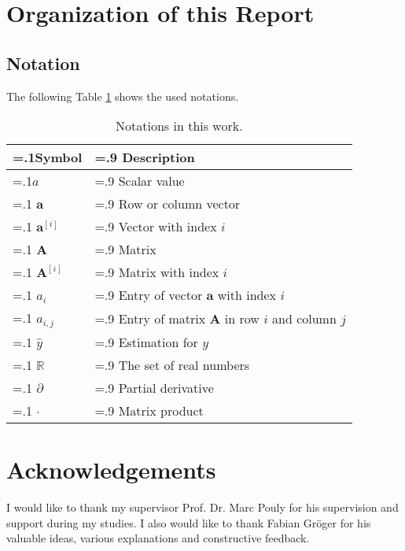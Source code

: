 \section{Organization of this Report}
\subsection{Notation}
The following Table \ref{tab:notation} shows the used notations.

\begin{table}[H]
\centering
\caption{Notations in this work.\label{tab:notation}}
\begin{tabularx}{\textwidth}{|
 >{\hsize=.1\hsize}X |
 >{\hsize=.9\hsize}X |
}
\hline
\textbf{Symbol} & \textbf{Description} \\ \hline
$a$ & Scalar value \\ \hline 
$\mathbf{a}$ & Row or column vector \\ \hline
$\mathbf{a}^{[i]}$ & Vector with index $i$  \\ \hline
$\mathbf{A}$ & Matrix \\ \hline 
$\mathbf{A}^{[i]}$ & Matrix with index $i$ \\ \hline 
$a_i$ & Entry of vector $\mathbf{a}$ with index $i$ \\ \hline 
$a_{i,j}$ & Entry of matrix $\mathbf{A}$ in row $i$ and column $j$ \\ \hline
$\hat{y}$ & Estimation for $y$ \\ \hline 
$\mathbb{R}$ & The set of real numbers \\ \hline
$\partial$ & Partial derivative \\ \hline
$\cdot$ & Matrix product \\ \hline
\end{tabularx}
\end{table}

\section{Acknowledgements}
I would like to thank my supervisor Prof. Dr. Marc Pouly for his supervision and support during my studies. I also would like to thank Fabian Gröger for his valuable ideas, various explanations and constructive feedback.
